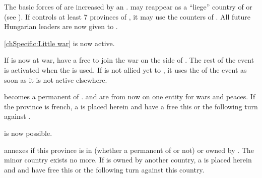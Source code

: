 

\effetlong
\aparag The basic forces of \HAB are increased by an \ARMY\facemoins.
\aparag \paysHongrie may reappear as a ``liege'' country of \HAB or \SPA (see
). %
\aparag If \HAB controls at least 7 provinces of \paysHongrie, it may use the
counters of \paysHongrie.
\aparag All future Hungarian leaders are now given to \HAB.

\aparag[] [BLP] \ref{chSpecific:Little war} is now active.




\aparag If \paysMilan is now at war, \HAB have a free \CB to join the war on
the side of \paysMilan. The rest of the event is activated when the \CB is
used.
\aparag If \HAB is not allied yet to \SPA, it uses the \CB of the event as
soon as it is not active elsewhere.

\phevnt
\aparag \paysMilan becomes a permanent \VASSAL of \HAB. \paysMilan and \HAB
are from now on one entity for wars and peaces.
\aparag If the province \provinceLombardia is french, a \REVOLT \facemoins is
placed herein and \HAB have a free \CB this or the following turn against
\FRA.

\effetlong
\aparag {} is now possible.






\phevnt
\aparag \SPA annexes \provinceLombardia if this province is in \paysMilan
(whether a permanent \VASSAL of \HAB or not) or owned by \HAB. The minor
country \paysMilan exists no more.
\aparag If \provinceLombardia is owned by another country, a \REVOLT
\facemoins is placed herein and \SPA and \HAB have free \CB this or the
following turn against this country.

